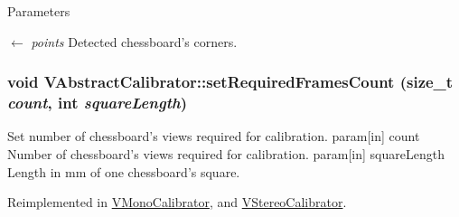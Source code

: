 \begin{DoxyParams}{Parameters}
\item[\mbox{$\leftarrow$} {\em points}]Detected chessboard's corners. \end{DoxyParams}
\hypertarget{classVAbstractCalibrator_a2c6ac60861d16f185930e7fbf09483f8}{
\subsubsection[{setRequiredFramesCount}]{\setlength{\rightskip}{0pt plus 5cm}void VAbstractCalibrator::setRequiredFramesCount (size\_\-t {\em count}, \/  int {\em squareLength})}}
\label{classVAbstractCalibrator_a2c6ac60861d16f185930e7fbf09483f8}
Set number of chessboard's views required for calibration. param\mbox{[}in\mbox{]} count Number of chessboard's views required for calibration. param\mbox{[}in\mbox{]} squareLength Length in mm of one chessboard's square. 

Reimplemented in \hyperlink{classVMonoCalibrator_ab3b2f7b28e77094385046d9eb53569ce}{VMonoCalibrator}, and \hyperlink{classVStereoCalibrator_a48004bae492ead13c14f0810b74bc4d0}{VStereoCalibrator}.

